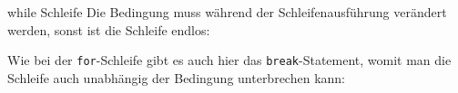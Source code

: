 	\begin{frame}{while Schleife}
	Die Bedingung muss während der Schleifenausführung verändert werden, sonst ist die Schleife endlos:
	
	Wie bei der \alert{\texttt{for}}-Schleife gibt es auch hier das \alert{\texttt{break}}-Statement, womit man die Schleife auch unabhängig der Bedingung unterbrechen kann:
	
	\end{frame}


